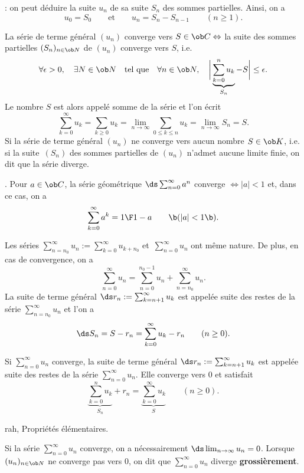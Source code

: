 \Remarque : on peut déduire la suite $u_n$ de sa suite $S_n$ des sommes partielles. Ainsi, on a 
$$
u_0=S_0\qquad \mbox{et}\qquad u_n=S_n-S_{n-1}\qquad(n\ge1). 
$$

La série de terme général $(u_n)$ converge vers $S\in\ob C\Leftrightarrow$ 
la suite des sommes partielles $(S_n)_{n\in\ob N}$ de $(u_n)$ converge vers $S$, i.e. 
$$
\forall\epsilon>0,\quad \exists N\in\ob N\quad \mbox{tel que} \quad \forall n\in\ob N, \quad 
\bigg|\underbrace{\sum_{k=0}^nu_k}_{S_n}-S\bigg|\le\epsilon. 
$$
Le nombre $S$ est alors appelé somme de la série et l'on écrit 
$$
\sum_{k=0}^\infty u_k=\sum_{k\ge0}u_k=\lim_{n\to\infty}\sum_{0\le k\le n}u_k=\lim_{n\to\infty}S_n=S. 
$$ 
Si la série de terme général $(u_n)$ ne converge vers aucun nombre $S\in\ob K$, i.e. si la suite~$(S_n)$ des sommes partielles de $(u_n)$ n'admet aucune limite finie, 
on dit que la série diverge. 
\medskip

\Exemple. Pour $a\in\ob C$, la série géométrique $\ds\sum_{n=0}^\infty a^n$ converge $\Leftrightarrow|a|<1$ et, dans ce cas, on a 
$$
\sum_{k=0}^\infty a^k={1\F1-a}\qquad\b(|a|<1\b). 
$$

Les séries $\sum_{n=n_0}^\infty u_n:=\sum_{k=0}^\infty u_{k+n_0}$ et~$\sum_{n=0}^\infty u_n$ ont même nature. 
De plus, en cas de convergence, on a 
$$
\sum_{n=0}^\infty u_n=\sum_{n=0}^{n_0-1}u_n+\sum_{n=n_0}^\infty u_n.
$$
La suite de terme général $\ds r_n:=\sum_{k=n+1}^\infty u_k$ 
est appelée suite des restes de la série $\sum_{n=n_0}^\infty u_n$ et l'on a 
$$
\ds S_n=S-r_n=\sum_{k=0}^\infty u_k-r_n\qquad(n\ge0).
$$ 

Si $\sum_{n=0}^\infty u_n$ converge, la suite de terme général $\ds r_n:=\sum_{k=n+1}^\infty u_k$ 
est appelée suite des restes de la série $\sum_{n=0}^\infty u_n$. Elle converge vers $0$ et satisfait 
$$
\underbrace{\sum_{k=0}^nu_k}_{S_n}+r_n=\underbrace{\sum_{k=0}^\infty u_k}_{S}\qquad(n\ge0).
$$ 


\Subsection rah, Propriétés élémentaires.


Si la série $\sum_{n=0}^\infty u_n$ converge, on a nécessairement $\ds\lim_{n\to\infty}u_n=0$. \medskip\noindent
Lorsque $(u_n)_{n\in\ob N}$ ne converge pas vers $0$, 
on dit que $\sum_{n=0}^\infty u_n$ diverge {\bf grossièrement}. 

